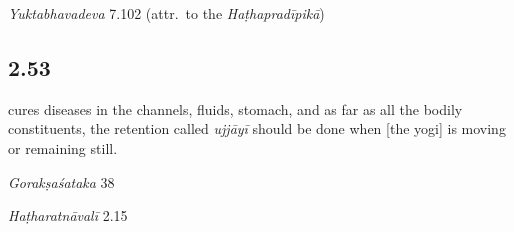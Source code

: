 \begin{ekdosis}
\begin{testimonia}[hp02_052]
\emph{Yuktabhavadeva} 7.102 (attr.~to the \emph{Haṭhapradīpikā})

\begin{versinnote} 
\end{versinnote}

\end{testimonia}

\begin{philcomm}[hp02_052]
\end{philcomm}

\subsection*{2.53}
\begin{translation}[hp02_053]
[and] cures diseases in the channels, fluids, stomach, and as far as all the bodily constituents, the retention called \emph{ujjāyī} should be done when [the yogi] is moving or remaining still.
\end{translation}

\begin{sources}[hp02_053]
\emph{Gorakṣaśataka} 38

\begin{versinnote}
\end{versinnote}
\end{sources}

\begin{testimonia}[hp02_053]
\emph{Haṭharatnāvalī} 2.15


\end{testimonia}
\end{ekdosis}
